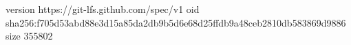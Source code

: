 version https://git-lfs.github.com/spec/v1
oid sha256:f705d53abd88e3d15a85da2db9b5d6e68d25ffdb9a48ceb2810db583869d9886
size 355802
